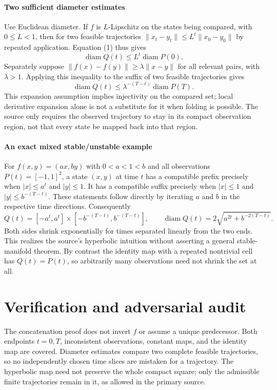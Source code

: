 \documentclass[11pt]{article}
\begin{document}
\paragraph{Two sufficient diameter estimates}
Use Euclidean diameter. If $f$ is $L$-Lipschitz on the states being compared, with $0\leq L<1$, then for two feasible trajectories $\lVert x_t-y_t\rVert\leq L^t\lVert x_0-y_0\rVert$ by repeated application. Equation (1) thus gives
\[
 \operatorname{diam}Q(t)\leq L^t\operatorname{diam}P(0).
\]
Separately suppose $\lVert f(x)-f(y)\rVert\geq\lambda\lVert x-y\rVert$ for all relevant pairs, with $\lambda>1$. Applying this inequality to the suffix of two feasible trajectories gives
\[
 \operatorname{diam}Q(t)\leq\lambda^{-(T-t)}\operatorname{diam}P(T).
\]
This expansion assumption implies injectivity on the compared set; local derivative expansion alone is not a substitute for it when folding is possible. The source only requires the observed trajectory to stay in its compact observation region, not that every state be mapped back into that region.

\paragraph{An exact mixed stable/unstable example}
For $f(x,y)=(a x,b y)$ with $0<a<1<b$ and all observations $P(t)=[-1,1]^2$, a state $(x,y)$ at time $t$ has a compatible prefix precisely when $|x|\leq a^t$ and $|y|\leq1$. It has a compatible suffix precisely when $|x|\leq1$ and $|y|\leq b^{-(T-t)}$. These statements follow directly by iterating $a$ and $b$ in the respective time directions. Consequently
\[
 Q(t)=[-a^t,a^t]\times[-b^{-(T-t)},b^{-(T-t)}],\qquad
 \operatorname{diam}Q(t)=2\sqrt{a^{2t}+b^{-2(T-t)}}.
\]
Both sides shrink exponentially for times separated linearly from the two ends. This realizes the source's hyperbolic intuition without asserting a general stable-manifold theorem. By contrast the identity map with a repeated nontrivial cell has $Q(t)=P(t)$, so arbitrarily many observations need not shrink the set at all.

\section{Verification and adversarial audit}
The concatenation proof does not invert $f$ or assume a unique predecessor. Both endpoints $t=0,T$, inconsistent observations, constant maps, and the identity map are covered. Diameter estimates compare two complete feasible trajectories, so no independently chosen time slices are mistaken for a trajectory. The hyperbolic map need not preserve the whole compact square; only the admissible finite trajectories remain in it, as allowed in the primary source.
\end{document}
